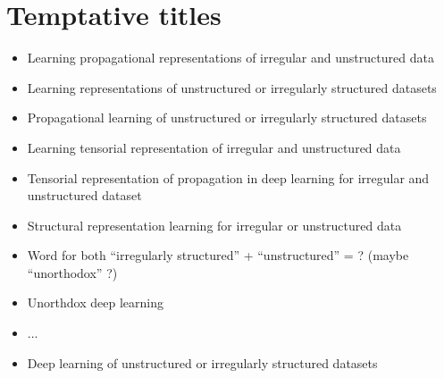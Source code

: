 \documentclass{article}
\begin{document}
\section*{Temptative titles}
\begin{itemize}
\item Learning propagational representations of irregular and unstructured data
\item Learning representations of unstructured or irregularly structured datasets
\item Propagational learning of unstructured or irregularly structured datasets
\item Learning tensorial representation of irregular and unstructured data
\item Tensorial representation of propagation in deep learning for irregular and unstructured dataset
\item Structural representation learning for irregular or unstructured data
\item Word for both ``irregularly structured'' + ``unstructured'' = ? (maybe ``unorthodox'' ?)
\item Unorthdox deep learning
\item ...
\item Deep learning of unstructured or irregularly structured datasets
\end{itemize}
\end{document}
